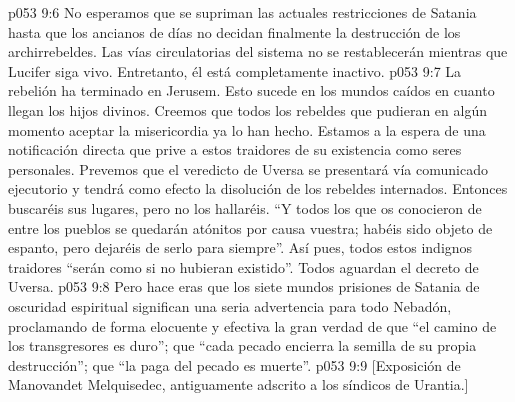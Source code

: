 \vs p053 9:6 No esperamos que se supriman las actuales restricciones de Satania hasta que los ancianos de días no decidan finalmente la destrucción de los archirrebeldes. Las vías circulatorias del sistema no se restablecerán mientras que Lucifer siga vivo. Entretanto, él está completamente inactivo.
\vs p053 9:7 La rebelión ha terminado en Jerusem. Esto sucede en los mundos caídos en cuanto llegan los hijos divinos. Creemos que todos los rebeldes que pudieran en algún momento aceptar la misericordia ya lo han hecho. Estamos a la espera de una notificación directa que prive a estos traidores de su existencia como seres personales. Prevemos que el veredicto de Uversa se presentará vía comunicado ejecutorio y tendrá como efecto la disolución de los rebeldes internados. Entonces buscaréis sus lugares, pero no los hallaréis. “Y todos los que os conocieron de entre los pueblos se quedarán atónitos por causa vuestra; habéis sido objeto de espanto, pero dejaréis de serlo para siempre”. Así pues, todos estos indignos traidores “serán como si no hubieran existido”. Todos aguardan el decreto de Uversa.
\vs p053 9:8 Pero hace eras que los siete mundos prisiones de Satania de oscuridad espiritual significan una seria advertencia para todo Nebadón, proclamando de forma elocuente y efectiva la gran verdad de que “el camino de los transgresores es duro”; que “cada pecado encierra la semilla de su propia destrucción”; que “la paga del pecado es muerte”.
\vsetoff
\vs p053 9:9 [Exposición de Manovandet Melquisedec, antiguamente adscrito a los síndicos de Urantia.]
